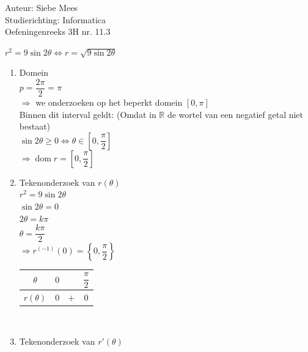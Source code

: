 \documentclass[a4paper]{article}
\begin{document}
  
\noindent \large Auteur: Siebe Mees \\
\noindent \large Studierichting: Informatica\\
\noindent \large Oefeningenreeks 3H nr. 11.3\\

\medskip

\normalsize

$r^2=9\sin 2\theta \Leftrightarrow r = \sqrt{9\sin2\theta}$\\

\begin{enumerate}

\item Domein\\

$p=\dfrac{2\pi}{2}=\pi$\\

$\Rightarrow$ we onderzoeken op het beperkt domein $[0,\pi]$\\

Binnen dit interval geldt: (Omdat in $\mathbb{R}$ de wortel van een negatief getal niet bestaat)\\

$\sin 2\theta\geq 0 \iff \theta \in \left[0,\dfrac{\pi}{2}\right]$\\

$\Rightarrow \operatorname{dom} r =\left[0,\dfrac{\pi}{2}\right]$\\


\item Tekenonderzoek van $r(\theta)$\\

$r^2=9\sin 2\theta$\\

$\sin 2\theta=0$\\

$2\theta=k\pi$\\

$\theta=\dfrac{k\pi}{2}$\\

$\Rightarrow r^{(-1)}(0)=\left\{0,\dfrac{\pi}{2}\right\}$\\

\begin{tabular}{c|ccc}
$\theta$ & $0$ &  & $\dfrac{\pi}{2}$ \\ \hline
$r(\theta)$ & $0$ & $+$ & $0$
\end{tabular}\\


\item Tekenonderzoek van $r'(\theta)$\\


\end{enumerate}
\end{document}
